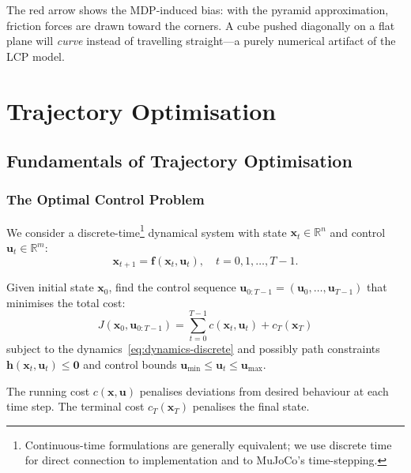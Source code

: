 \documentclass[11pt,twoside]{report}
\theoremstyle{definition}
\theoremstyle{plain}
\theoremstyle{remark}
\newcommand{\R}{\mathbb{R}}
\newcommand{\x}{\bm{x}}
\newcommand{\uu}{\bm{u}}
\newcommand{\f}{\bm{f}}
\newcommand{\0}{\bm{0}}
\begin{document}
The red arrow shows the MDP-induced bias: with the pyramid approximation, friction forces are drawn toward the corners.  A cube pushed diagonally on a flat plane will \emph{curve} instead of travelling straight---a purely numerical artifact of the LCP model.


\part{Trajectory Optimisation}

\chapter{Fundamentals of Trajectory Optimisation}
\label{ch:trajopt-fund}

\section{The Optimal Control Problem}

We consider a discrete-time\footnote{Continuous-time formulations are
generally equivalent; we use discrete time for direct connection to
implementation and to MuJoCo's time-stepping.} dynamical system
with state $\x_{t}\in\R^{n}$ and control $\uu_{t}\in\R^{m}$:
\begin{equation}\label{eq:dynamics-discrete}
\x_{t+1}=\f(\x_{t},\uu_{t}),\quad t=0,1,\ldots,T{-}1.
\end{equation}

\begin{definitionbox}
Given initial state $\x_{0}$, find the control sequence
$\uu_{0:T-1}=(\uu_{0},\ldots,\uu_{T-1})$ that minimises the total cost:
\begin{equation}\label{eq:oc-objective}
\boxed{
J(\x_{0},\uu_{0:T-1})
=\sum_{t=0}^{T-1}c(\x_{t},\uu_{t})+c_{T}(\x_{T})
}
\end{equation}
subject to the dynamics~\eqref{eq:dynamics-discrete} and possibly
path constraints $\bm{h}(\x_{t},\uu_{t})\le\0$
and control bounds $\uu_{\min}\le\uu_{t}\le\uu_{\max}$.
\end{definitionbox}

The running cost $c(\x,\uu)$ penalises deviations from desired behaviour at each time step.
The terminal cost $c_{T}(\x_{T})$ penalises the final state.
\end{document}

